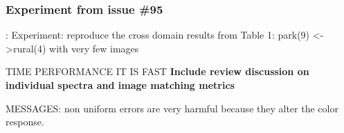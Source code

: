\documentclass{bmvc2k}
\begin{document}
	\subsubsection{Experiment from issue \#95}: 
Experiment: reproduce the cross domain results from Table 1: park(9) <->rural(4) with very few images

TIME PERFORMANCE IT IS FAST
{\bf Include review discussion on individual spectra and image matching metrics}

MESSAGES:
non uniform errors are very harmful because they alter the color response.

\end{document}
